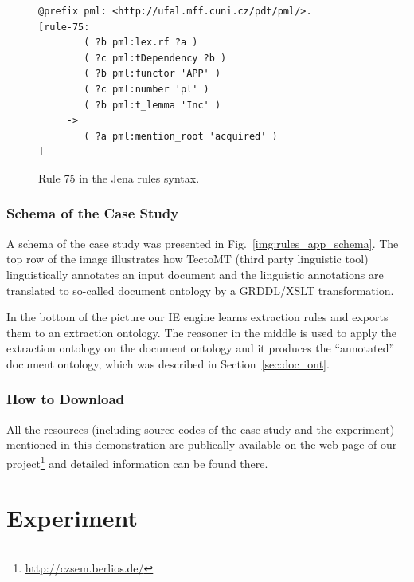\begin{figure}
\begin{verbatim}
@prefix pml: <http://ufal.mff.cuni.cz/pdt/pml/>.
[rule-75:  
        ( ?b pml:lex.rf ?a )
        ( ?c pml:tDependency ?b )
        ( ?b pml:functor 'APP' )
        ( ?c pml:number 'pl' )
        ( ?b pml:t_lemma 'Inc' )
     -> 
        ( ?a pml:mention_root 'acquired' )
]
\end{verbatim}
\caption{Rule 75 in the Jena rules syntax.}
\label{img:rules_jena}
\end{figure}


\subsubsection{Schema of the Case Study}


A schema of the case study was presented in Fig.~\ref{img:rules_app_schema}.  
The top row of the image illustrates how TectoMT (third party linguistic tool) linguistically annotates an input document and the linguistic annotations are translated to so-called document ontology by a GRDDL/XSLT transformation.

In the bottom of the picture our IE engine learns extraction rules and exports them to an extraction ontology. The reasoner in the middle is used to apply the extraction ontology on the document ontology and it produces the ``annotated'' document ontology, which was described in Section~\ref{sec:doc_ont}.




\subsubsection{How to Download}
All the resources (including source codes of the case study and the experiment) mentioned in this demonstration are publically available on the web-page of our project\footnote{\url{http://czsem.berlios.de/}} and detailed information can be found there.


\section{Experiment} \label{sec:ch70_experiment}



